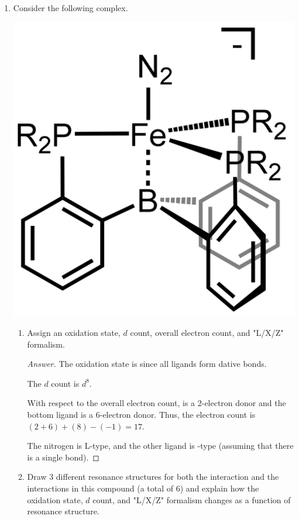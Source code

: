 \documentclass[../psets.tex]{subfiles}
\begin{document}
\begin{enumerate}
\begin{enumerate}[label={\alph*)}]
\begin{proof}[Answer]
        \end{proof}
        \item Which complex is more likely to have its  bond hydrolyze between 8 and 12 ( and )?
        \begin{proof}[Answer]
            8 is more likely to have its  bond hydrolyze. In 12, benzene, because it is so stable, is not a great leaving group and the square planar geometry at each metal center is extra stable because of the 16 electron rule (or 18 electrons depending on  bonding). However, in 8, the  bond is highly unstable due to the electron count of 14.
        \end{proof}
    \end{enumerate}
    \item Consider the following complex.
    \begin{center}
        \includegraphics[width=0.23\linewidth]{../ExtFiles/pset1-3.png}
    \end{center}
    \begin{enumerate}[label={\alph*)}]
        \item Assign an oxidation state, $d$ count, overall electron count, and "L/X/Z" formalism.
        \begin{proof}[Answer]
            The oxidation state is  since all ligands form dative bonds.\par
            The $d$ count is $d^8$.\par
            With respect to the overall electron count,  is a 2-electron donor and the bottom ligand is a 6-electron donor. Thus, the electron count is $(2+6)+(8)-(-1)=17$.\par
            The nitrogen is L-type, and the other ligand is -type (assuming that there is a single  bond).
        \end{proof}
        \item Draw 3 different resonance structures for both the  interaction and the  interactions in this compound (a total of 6) and explain how the oxidation state, $d$ count, and "L/X/Z" formalism changes as a function of resonance structure.

\end{enumerate}
\end{enumerate}
\end{document}
